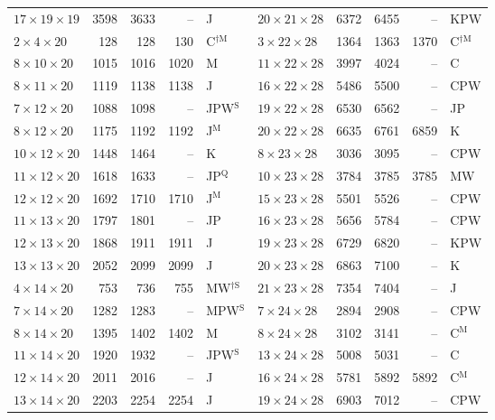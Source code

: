 \begin{longtable}{@{}lrrrl@{\hspace{6mm}}lrrrl@{}}
$17{\times}19{\times}19$ & 3598 & 3633 & -- & J & $20{\times}21{\times}28$ & 6372 & 6455 & -- & KPW\\
$2{\times}4{\times}20$ & 128 & 128 & 130 & C$^{\dagger\mathrm{M}}$ & $3{\times}22{\times}28$ & 1364 & 1363 & 1370 & C$^{\dagger\mathrm{M}}$\\
$8{\times}10{\times}20$ & 1015 & 1016 & 1020 & M & $11{\times}22{\times}28$ & 3997 & 4024 & -- & C\\
$8{\times}11{\times}20$ & 1119 & 1138 & 1138 & J & $16{\times}22{\times}28$ & 5486 & 5500 & -- & CPW\\
$7{\times}12{\times}20$ & 1088 & 1098 & -- & JPW$^{\mathrm{S}}$ & $19{\times}22{\times}28$ & 6530 & 6562 & -- & JP\\
$8{\times}12{\times}20$ & 1175 & 1192 & 1192 & J$^{\mathrm{M}}$ & $20{\times}22{\times}28$ & 6635 & 6761 & 6859 & K\\
$10{\times}12{\times}20$ & 1448 & 1464 & -- & K & $8{\times}23{\times}28$ & 3036 & 3095 & -- & CPW\\
$11{\times}12{\times}20$ & 1618 & 1633 & -- & JP$^{\mathrm{Q}}$ & $10{\times}23{\times}28$ & 3784 & 3785 & 3785 & MW\\
$12{\times}12{\times}20$ & 1692 & 1710 & 1710 & J$^{\mathrm{M}}$ & $15{\times}23{\times}28$ & 5501 & 5526 & -- & CPW\\
$11{\times}13{\times}20$ & 1797 & 1801 & -- & JP & $16{\times}23{\times}28$ & 5656 & 5784 & -- & CPW\\
$12{\times}13{\times}20$ & 1868 & 1911 & 1911 & J & $19{\times}23{\times}28$ & 6729 & 6820 & -- & KPW\\
$13{\times}13{\times}20$ & 2052 & 2099 & 2099 & J & $20{\times}23{\times}28$ & 6863 & 7100 & -- & K\\
$4{\times}14{\times}20$ & 753 & 736 & 755 & MW$^{\dagger\mathrm{S}}$ & $21{\times}23{\times}28$ & 7354 & 7404 & -- & J\\
$7{\times}14{\times}20$ & 1282 & 1283 & -- & MPW$^{\mathrm{S}}$ & $7{\times}24{\times}28$ & 2894 & 2908 & -- & CPW\\
$8{\times}14{\times}20$ & 1395 & 1402 & 1402 & M & $8{\times}24{\times}28$ & 3102 & 3141 & -- & C$^{\mathrm{M}}$\\
$11{\times}14{\times}20$ & 1920 & 1932 & -- & JPW$^{\mathrm{S}}$ & $13{\times}24{\times}28$ & 5008 & 5031 & -- & C\\
$12{\times}14{\times}20$ & 2011 & 2016 & -- & J & $16{\times}24{\times}28$ & 5781 & 5892 & 5892 & C$^{\mathrm{M}}$\\
$13{\times}14{\times}20$ & 2203 & 2254 & 2254 & J & $19{\times}24{\times}28$ & 6903 & 7012 & -- & CPW\\

\end{longtable}
